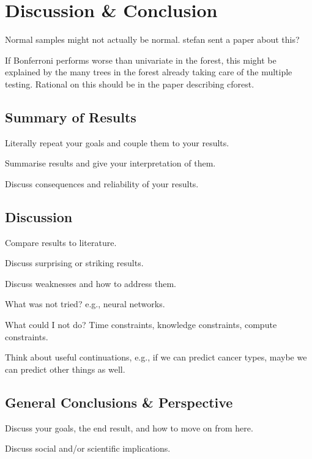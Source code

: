 \chapter{Discussion \& Conclusion}
Normal samples might not actually be normal. stefan sent a paper about this?

If Bonferroni performs worse than univariate in the forest, this might be explained by the many trees in the forest already taking care of the multiple testing.
Rational on this should be in the paper describing cforest.

\section{Summary of Results}
Literally repeat your goals and couple them to your results.

Summarise results and give your interpretation of them.

Discuss consequences and reliability of your results.

\section{Discussion}
Compare results to literature.

Discuss surprising or striking results.

Discuss weaknesses and how to address them.

What was not tried?
e.g., neural networks.

What could I not do?
Time constraints, knowledge constraints, compute constraints.

Think about useful continuations, e.g., if we can predict cancer types, maybe we can predict other things as well.

\section{General Conclusions \& Perspective}
Discuss your goals, the end result, and how to move on from here.

Discuss social and/or scientific implications.
